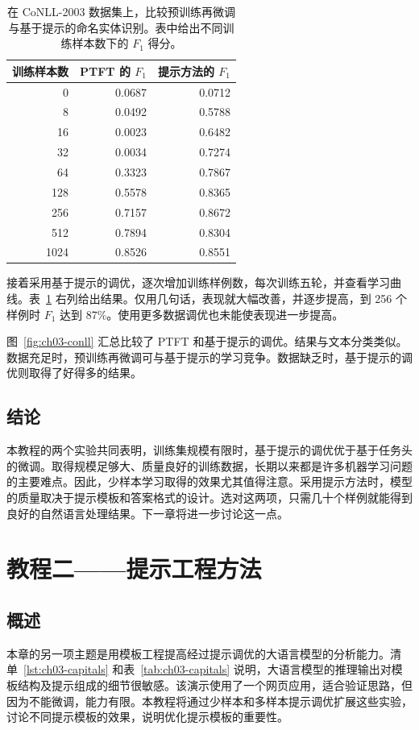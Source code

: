 \begin{table}[!htbp]
\centering
\caption{在 CoNLL-2003 数据集上，比较预训练再微调与基于提示的命名实体识别。表中给出不同训练样本数下的 $F_1$ 得分。}
\label{tab:ch03-conll}
\begin{tabular}{@{}rrr@{}}
\toprule
训练样本数 & PTFT 的 $F_1$ & 提示方法的 $F_1$\\
\midrule
0 & 0.0687 & 0.0712\\
8 & 0.0492 & 0.5788\\
16 & 0.0023 & 0.6482\\
32 & 0.0034 & 0.7274\\
64 & 0.3323 & 0.7867\\
128 & 0.5578 & 0.8365\\
256 & 0.7157 & 0.8672\\
512 & 0.7894 & 0.8304\\
1024 & 0.8526 & 0.8551\\
\bottomrule
\end{tabular}
\end{table}

接着采用基于提示的调优，逐次增加训练样例数，每次训练五轮，并查看学习曲线。表~\ref{tab:ch03-conll} 右列给出结果。仅用几句话，表现就大幅改善，并逐步提高，到 256 个样例时 $F_1$ 达到 87\%。使用更多数据调优也未能使表现进一步提高。

图~\ref{fig:ch03-conll} 汇总比较了 PTFT 和基于提示的调优。结果与文本分类类似。数据充足时，预训练再微调可与基于提示的学习竞争。数据缺乏时，基于提示的调优则取得了好得多的结果。


\subsection{结论}
本教程的两个实验共同表明，训练集规模有限时，基于提示的调优优于基于任务头的微调。取得规模足够大、质量良好的训练数据，长期以来都是许多机器学习问题的主要难点。因此，少样本学习取得的效果尤其值得注意。采用提示方法时，模型的质量取决于提示模板和答案格式的设计。选对这两项，只需几十个样例就能得到良好的自然语言处理结果。下一章将进一步讨论这一点。

\section{教程二——提示工程方法}
\label{sec:ch03-tutorial-two}
\subsection{概述}
本章的另一项主题是用模板工程提高经过提示调优的大语言模型的分析能力。清单~\ref{lst:ch03-capitals} 和表~\ref{tab:ch03-capitals} 说明，大语言模型的推理输出对模板结构及提示组成的细节很敏感。该演示使用了一个网页应用，适合验证思路，但因为不能微调，能力有限。本教程将通过少样本和多样本提示调优扩展这些实验，讨论不同提示模板的效果，说明优化提示模板的重要性。

